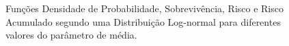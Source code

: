 \documentclass[
  12pt,
  letterpaper,
  DIV=11,
  numbers=noendperiod]{scrreprt}
\begin{document}
\begin{figure}[H]

\caption{\label{fig-CurvasLognormal}Funções Densidade de Probabilidade,
Sobrevivência, Risco e Risco Acumulado segundo uma Distribuição
Log-normal para diferentes valores do parâmetro de média.}

\begin{minipage}{0.50\linewidth}



\end{minipage}%
%
\begin{minipage}{0.50\linewidth}

\end{minipage}
\end{figure}
\end{document}
